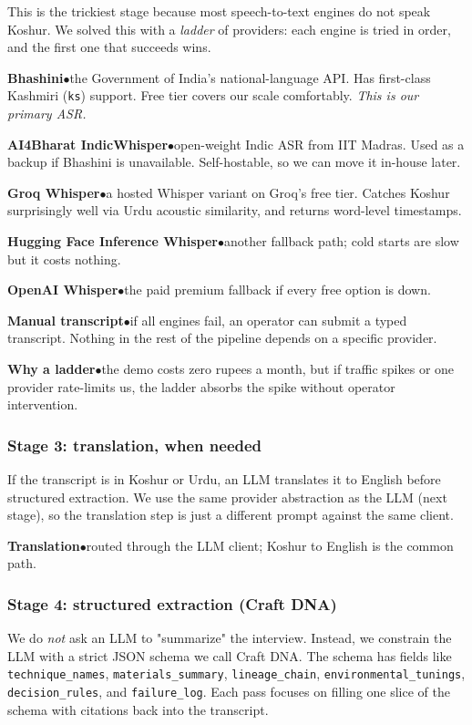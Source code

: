\documentclass[11pt,a4paper]{article}
\newcommand{\stack}[2]{%
  \par\noindent\textbf{\color{walnut}#1}\hspace{0.5em}\textcolor{rouge}{$\bullet$}\hspace{0.5em}\textcolor{faded}{#2}\par
}
\begin{document}
This is the trickiest stage because most speech-to-text engines do not
speak Koshur. We solved this with a \emph{ladder} of providers: each
engine is tried in order, and the first one that succeeds wins.

\stack{Bhashini}{the Government of India's national-language API. Has
first-class Kashmiri (\texttt{ks}) support. Free tier covers our scale
comfortably. \emph{This is our primary ASR.}}
\stack{AI4Bharat IndicWhisper}{open-weight Indic ASR from IIT Madras.
Used as a backup if Bhashini is unavailable. Self-hostable, so we can
move it in-house later.}
\stack{Groq Whisper}{a hosted Whisper variant on Groq's free tier.
Catches Koshur surprisingly well via Urdu acoustic similarity, and
returns word-level timestamps.}
\stack{Hugging Face Inference Whisper}{another fallback path; cold
starts are slow but it costs nothing.}
\stack{OpenAI Whisper}{the paid premium fallback if every free option
is down.}
\stack{Manual transcript}{if all engines fail, an operator can submit
a typed transcript. Nothing in the rest of the pipeline depends on a
specific provider.}

\stack{Why a ladder}{the demo costs zero rupees a month, but if traffic
spikes or one provider rate-limits us, the ladder absorbs the spike
without operator intervention.}

\subsubsection*{Stage 3: translation, when needed}

If the transcript is in Koshur or Urdu, an LLM translates it to English
before structured extraction. We use the same provider abstraction as
the LLM (next stage), so the translation step is just a different
prompt against the same client.

\stack{Translation}{routed through the LLM client; Koshur to English is
the common path.}

\subsubsection*{Stage 4: structured extraction (Craft DNA)}

We do \emph{not} ask an LLM to "summarize" the interview. Instead, we
constrain the LLM with a strict JSON schema we call Craft DNA. The
schema has fields like \texttt{technique\_names},
\texttt{materials\_summary}, \texttt{lineage\_chain},
\texttt{environmental\_tunings}, \texttt{decision\_rules}, and
\texttt{failure\_log}. Each pass focuses on filling one slice of the
schema with citations back into the transcript.
\end{document}
